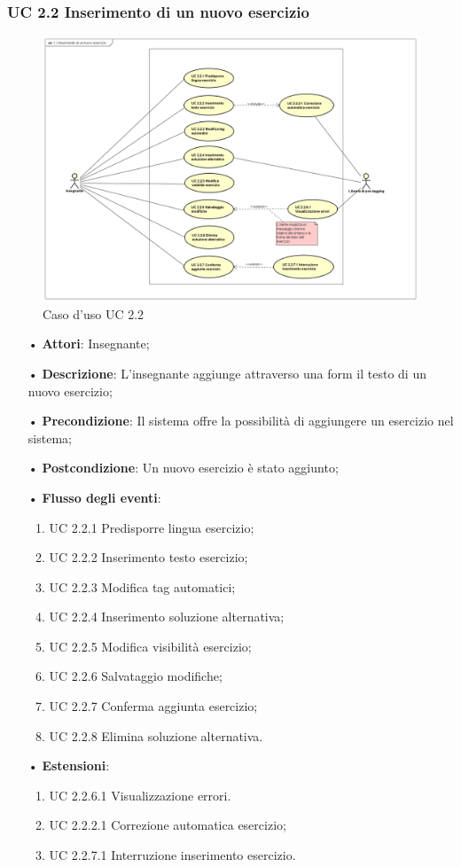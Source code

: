 \subsubsection{UC 2.2 Inserimento di un nuovo esercizio}

\begin{figure}[H]
	\centering
	\includegraphics[width=18cm]{img/UC22.png} 
	\caption{Caso d'uso UC 2.2}
\end{figure}

\begin{itemize}
	\item[•] \textbf{Attori}: Insegnante;
	\item[•] \textbf{Descrizione}: L'insegnante aggiunge attraverso una form il testo di un nuovo esercizio;
	\item[•] \textbf{Precondizione}: Il sistema offre la possibilità di aggiungere un esercizio nel sistema;
	\item[•] \textbf{Postcondizione}: Un nuovo esercizio è stato aggiunto;
	\item[•] \textbf{Flusso degli eventi}:
	\begin{enumerate}
		\item UC 2.2.1 Predisporre lingua esercizio;
		\item UC 2.2.2 Inserimento testo esercizio;
		\item UC 2.2.3 Modifica tag automatici;
		\item UC 2.2.4 Inserimento soluzione alternativa;
		\item UC 2.2.5 Modifica visibilità esercizio;
		\item UC 2.2.6 Salvataggio modifiche;
		\item UC 2.2.7 Conferma aggiunta esercizio;
		\item UC 2.2.8 Elimina soluzione alternativa.
	\end{enumerate}
	\item[•] \textbf{Estensioni}:	
	\begin{enumerate}
		\item UC 2.2.6.1 Visualizzazione errori.
		\item UC 2.2.2.1 Correzione automatica esercizio;
		\item UC 2.2.7.1 Interruzione inserimento esercizio.
	\end{enumerate}
\end{itemize}
